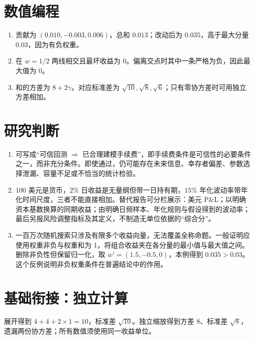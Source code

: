 \section*{数值编程}
\begin{enumerate}[leftmargin=*]
  \item 贡献为 $(0.010,-0.003,0.006)$，总和 $0.013$；改动后为 $0.035$，高于最大分量 $0.03$，因为有负权重。
  \item 在 $w=1/2$ 两线相交且最坏收益为 0。偏离交点时其中一条严格为负，因此最大值为 0。
  \item 和的方差为 $8+2\gamma$，对应标准差为 $\sqrt{10},\sqrt8,\sqrt6$；只有零协方差时可用独立方差相加。
\end{enumerate}

\section*{研究判断}
\begin{enumerate}[leftmargin=*]
  \item 可写成“可信回测 $\Rightarrow$ 已合理建模手续费”，即手续费条件是可信性的必要条件之一，而非充分条件。即使通过，仍可能存在未来信息、幸存者偏差、参数选择泄漏、容量不足或不恰当的统计检验。
  \item $100$ 美元是货币，$2\%$ 日收益是无量纲但带一日持有期，$15\%$ 年化波动率带年化时间尺度，三者不能直接相加。替代报告可分栏展示：美元 P\&L；以明确资本基数换算的同期收益；由明确日频样本、年化规则与假设得到的波动率；最后另报风险调整指标及其定义，不制造无单位依据的“综合分”。
  \item 一百万次随机搜索只涉及有限多个收益向量，无法覆盖全称命题。一般证明应使用权重非负与权重和为 1，将组合收益夹在各分量的最小值与最大值之间。删除非负性但保留归一化，取 $w'=(1.5,-0.5,0)$，本例得到 $0.035>0.03$。这个反例说明非负权重条件在普遍结论中的作用。
\end{enumerate}

\section*{基础衔接：独立计算}
展开得到 $4+4+2\times1=10$，标准差 $\sqrt{10}$。独立缩放得到方差 $8$、标准差 $\sqrt8$，遗漏两份协方差；所有数值须使用同一收益单位。
